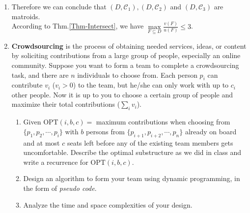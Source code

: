 \documentclass[12pt,a4paper,UTF8]{article}
\makeatletter
\newtheorem*{solution}{Solution}
\theoremstyle{definition}
\renewenvironment{solution}[1][Solution] {\par\pushQED{\qed}\normalfont\topsep6\p@\@plus6\p@\relax\trivlist\item[\hskip\labelsep\bfseries#1\@addpunct{.}]\ignorespaces}{\popQED\endtrivlist\@endpefalse} \makeatother
\makeatother
\begin{document}
\begin{enumerate}
\begin{solution}
\begin{enumerate}
			Therefore we can conclude that $ (D,\mathcal{C}_1),(D,\mathcal{C}_2) $ and $ (D,\mathcal{C}_3) $ are matroids.\\
			According to Thm.\ref{Thm-Intersect}, we have  $\max\limits_{F \subseteq D} \frac{v(F)}{u(F)} \leq 3$. 
		\end{enumerate}
	\end{solution}


	\item
	\textbf{Crowdsourcing} is the process of obtaining needed services, ideas, or content by soliciting contributions from a large group of people, especially an online community. Suppose you want to form a team to complete a crowdsourcing task, and there are $n$ individuals to choose from. Each person $p_i$ can contribute $v_i$ ($v_i > 0$) to the team, but he/she can only work with up to $c_i$ other people. Now it is up to you to choose a certain group of people and maximize their total contributions ($\sum_i{v_i}$).
	
	\begin{enumerate}
		\item Given $\text{OPT}(i, b, c)=$ maximum contributions when choosing from $\{p_1, p_2, \cdots, p_i\}$ with $b$ persons from $\{p_{i+1}, p_{i+2}, \cdots, p_n\}$ already on board and at most $c$ seats left before any of the existing team members gets uncomfortable. Describe the optimal substructure as we did in class and write a recurrence for $\text{OPT}(i, b, c)$.
		\item Design an algorithm to form your team using dynamic programming, in the form of \emph{pseudo code}.
        \item Analyze the time and space complexities of your design.
	\end{enumerate}


\end{enumerate}
\end{document}
